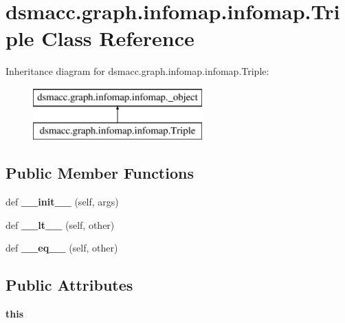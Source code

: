 \hypertarget{classdsmacc_1_1graph_1_1infomap_1_1infomap_1_1Triple}{}\section{dsmacc.\+graph.\+infomap.\+infomap.\+Triple Class Reference}
\label{classdsmacc_1_1graph_1_1infomap_1_1infomap_1_1Triple}
Inheritance diagram for dsmacc.\+graph.\+infomap.\+infomap.\+Triple\+:\begin{figure}[H]
\begin{center}
\leavevmode
\includegraphics[height=2.000000cm]{classdsmacc_1_1graph_1_1infomap_1_1infomap_1_1Triple}
\end{center}
\end{figure}
\subsection*{Public Member Functions}
\begin{DoxyCompactItemize}
\item 
\mbox{\label{classdsmacc_1_1graph_1_1infomap_1_1infomap_1_1Triple_a1d6829c389a9b7f2fc7bf3578fba6262}} 
def {\bfseries \+\_\+\+\_\+init\+\_\+\+\_\+} (self, args)
\item 
\mbox{\label{classdsmacc_1_1graph_1_1infomap_1_1infomap_1_1Triple_a33b8913da55bf4fcff0cbb1299ad2d22}} 
def {\bfseries \+\_\+\+\_\+lt\+\_\+\+\_\+} (self, other)
\item 
\mbox{\label{classdsmacc_1_1graph_1_1infomap_1_1infomap_1_1Triple_a2fb70be6654fa0dcb8d9519d3cff31eb}} 
def {\bfseries \+\_\+\+\_\+eq\+\_\+\+\_\+} (self, other)
\end{DoxyCompactItemize}
\subsection*{Public Attributes}
\begin{DoxyCompactItemize}
\item 
\mbox{\label{classdsmacc_1_1graph_1_1infomap_1_1infomap_1_1Triple_acecc2874933ec622a1228d3ebf8b8f76}} 
{\bfseries this}
\end{DoxyCompactItemize}
